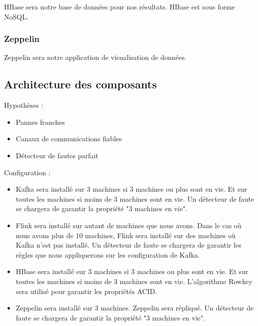 \documentclass[a4paper,oneside,10pt]{article}
\begin{document}
HBase sera notre base de données pour nos résultats. HBase est sous forme NoSQL. 

\subsubsection{Zeppelin}
Zeppelin sera notre application de visualisation de données. 

\subsection{Architecture des composants}


Hypothèses : 
\begin{itemize}
	\item Pannes franches
	\item Canaux de communications fiables
	\item Détecteur de fautes parfait
\end{itemize}

Configuration : 
\begin{itemize}
	\item Kafka sera installé sur 3 machines si 3 machines ou plus sont en vie. Et sur toutes les machines si moins de 3 machines sont en vie. Un détecteur de faute se chargera de garantir la propriété "3 machines en vie".
	\item Flink sera installé sur autant de machines que nous avons. Dans le cas où nous avons plus de 10 machines, Flink sera installé sur des machines où Kafka n'est pas installé. Un détecteur de faute se chargera de garantir les règles que nous appliquerons sur les configuration de Kafka. 
	\item HBase sera installé sur 3 machines si 3 machines ou plus sont en vie. Et sur toutes les machines si moins de 3 machines sont en vie. L'algorithme Rowkey sera utilisé pour garantir les propriétés ACID.
	\item Zeppelin sera installé sur 3 machines. Zeppelin sera répliqué. Un détecteur de faute se chargera de garantir la propriété "3 machines en vie".
\end{itemize}
\end{document}
